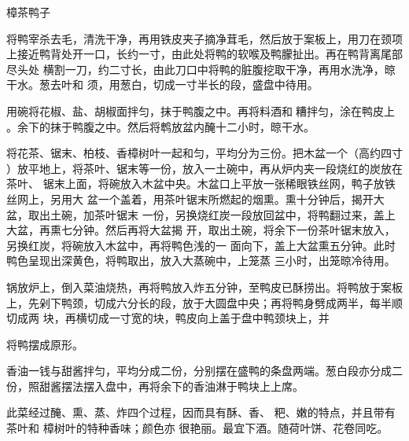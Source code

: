 \begin{recipe}{樟茶鸭子}

\ingredients


\preparation

\step 将鸭宰杀去毛，清洗干净，再用铁皮夹子摘净茸毛，然后放于案板上，用刀在颈项
上接近鸭背处开一口，长约一寸，由此处将鸭的软喉及鸭朦扯出。再在鸭背离尾部尽头处
横割一刀，约二寸长，由此刀口中将鸭的脏腹挖取干净，再用水洗净，晾干水。葱去叶和
须，用葱白，切成一寸半长的段，盛盘中待用。

\step 用碗将花椒、盐、胡椒面拌匀，抹于鸭腹之中。再将料酒和𫃑糟拌匀，涂在鸭皮上
。余下的抹于鸭腹之中。然后将鹎放盆内醃十二小时，晾干水。

\step 将花茶、锯末、柏枝、香樟树叶一起和匀，平均分为三份。把木盆一个（高约四寸
）放平地上，将茶叶、锯末等一份，放入一土碗中，再从炉内夹一段烧红的炭放在茶叶、
锯末上面，将碗放入木盆中央。木盆口上平放一张稀眼铁丝网，鸭子放铁丝网上，另用大
盆一个盖着，用茶叶锯末所燃起的烟熏。熏十分钟后，揭开大盆，取出土碗，加茶叶锯末
一份，另换烧红炭一段放回盆中，将鸭翻过来，盖上大盆，再熏七分钟。然后再将大盆揭
开，取出土碗，将余下一份茶叶锯末放入，另换红炭，将碗放入木盆中，再将鸭色浅的一
面向下，盖上大盆熏五分钟。此时鸭色呈现出深黄色，将鸭取出，放入大蒸碗中，上笼蒸
三小时，出笼晾冷待用。

\step 锅放炉上，倒入菜油烧热，再将鸭放入炸五分钟，至鸭皮已酥捞出。将鸭放于案板
上，先剁下鸭颈，切成六分长的段，放于大圆盘中央；再将鸭身劈成两半，每半顺切成两
块，再横切成一寸宽的块，鸭皮向上盖于盘中鸭颈块上，并

将鸭摆成原形。

\step 香油一钱与甜酱拌匀，平均分成二份，分别摆在盛鸭的条盘两端。葱白段亦分成二
份，照甜酱摆法摆入盘中，再将余下的香油淋于鸭块上上席。

\features

此菜经过醃、熏、蒸、炸四个过程，因而具有酥、香、 粑、嫩的特点，并且带有茶叶和
樟树叶的特种香味；颜色亦 很艳丽。最宜下酒。随荷叶饼、花卷同吃。

\end{recipe}

